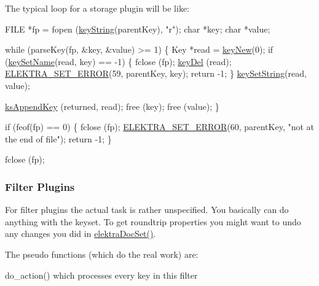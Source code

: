 The typical loop for a storage plugin will be like\+:


\begin{DoxyCodeInclude}
        FILE *fp = fopen (\hyperlink{group__keyvalue_ga880936f2481d28e6e2acbe7486a21d05}{keyString}(parentKey), \textcolor{stringliteral}{"r"});
        \textcolor{keywordtype}{char} *key;
        \textcolor{keywordtype}{char} *value;

        \textcolor{keywordflow}{while} (parseKey(fp, &key, &value) >= 1)
        \{
                Key *read = \hyperlink{group__key_gad23c65b44bf48d773759e1f9a4d43b89}{keyNew}(0);
                \textcolor{keywordflow}{if} (\hyperlink{group__keyname_ga7699091610e7f3f43d2949514a4b35d9}{keySetName}(read, key) == -1)
                \{
                        fclose (fp);
                        \hyperlink{group__key_ga3df95bbc2494e3e6703ece5639be5bb1}{keyDel} (read);
                        \hyperlink{group__plugin_gaab1842b82272e6d4235b6a71587a64d9}{ELEKTRA\_SET\_ERROR}(59, parentKey, key);
                        \textcolor{keywordflow}{return} -1;
                \}
                \hyperlink{group__keyvalue_ga622bde1eb0e0c4994728331326340ef2}{keySetString}(read, value);

                \hyperlink{group__keyset_gaa5a1d467a4d71041edce68ea7748ce45}{ksAppendKey} (returned, read);
                free (key);
                free (value);
        \}

        \textcolor{keywordflow}{if} (feof(fp) == 0)
        \{
                fclose (fp);
                \hyperlink{group__plugin_gaab1842b82272e6d4235b6a71587a64d9}{ELEKTRA\_SET\_ERROR}(60, parentKey, \textcolor{stringliteral}{"not at the end of file"});
                \textcolor{keywordflow}{return} -1;
        \}

        fclose (fp);
\end{DoxyCodeInclude}
 \hypertarget{group__plugin_filter}{}\subsubsection{Filter Plugins}\label{group__plugin_filter}
For filter plugins the actual task is rather unspecified. You basically can do anything with the keyset. To get roundtrip properties you might want to undo any changes you did in \hyperlink{group__plugin_gae65781a1deb34efc79c8cb9d9174842c}{elektra\+Doc\+Set()}.

The pseudo functions (which do the real work) are\+:
\begin{DoxyItemize}
\item do\+\_\+action() which processes every key in this filter
\end{DoxyItemize}


